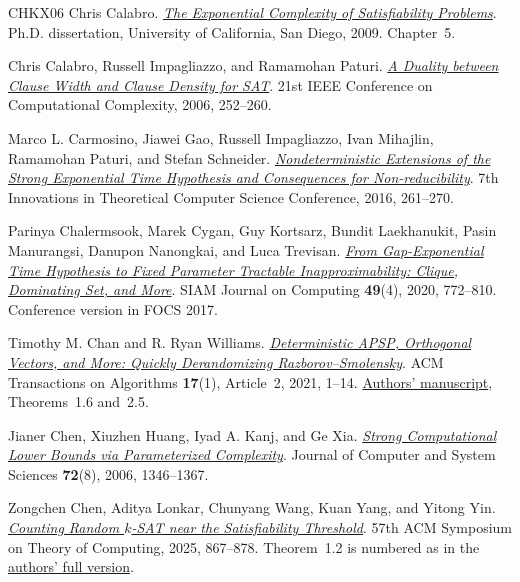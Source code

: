 \documentclass[11pt,reqno]{amsart}
\numberwithin{equation}{section}
\theoremstyle{definition}\newtheorem{definition}[theorem]{Definition}
\theoremstyle{remark}\newtheorem{remark}[theorem]{Remark}
\begin{document}
\begin{thebibliography}{CHKX06}
Chris Calabro.
\href{https://cseweb.ucsd.edu/~ccalabro/dissertation_single_spaced.pdf}
{\emph{The Exponential Complexity of Satisfiability Problems}}.
Ph.D. dissertation, University of California, San Diego, 2009.
Chapter~5.

Chris Calabro, Russell Impagliazzo, and Ramamohan Paturi.
\href{https://cseweb.ucsd.edu/~paturi/myPapers/pubs/CalabroImpagliazzoPaturi_2006_ccc.pdf}
{\emph{A Duality between Clause Width and Clause Density for SAT}}.
21st IEEE Conference on Computational Complexity, 2006, 252--260.

Marco L. Carmosino, Jiawei Gao, Russell Impagliazzo, Ivan Mihajlin,
Ramamohan Paturi, and Stefan Schneider.
\href{https://doi.org/10.1145/2840728.2840746}
{\emph{Nondeterministic Extensions of the Strong Exponential Time
Hypothesis and Consequences for Non-reducibility}}.
7th Innovations in Theoretical Computer Science Conference, 2016, 261--270.

Parinya Chalermsook, Marek Cygan, Guy Kortsarz, Bundit Laekhanukit,
Pasin Manurangsi, Danupon Nanongkai, and Luca Trevisan.
\href{https://doi.org/10.1137/18M1166869}
{\emph{From Gap-Exponential Time Hypothesis to Fixed Parameter Tractable
Inapproximability: Clique, Dominating Set, and More}}.
SIAM Journal on Computing \textbf{49}(4), 2020, 772--810.
Conference version in FOCS 2017.

Timothy M. Chan and R. Ryan Williams.
\href{https://doi.org/10.1145/3402926}
{\emph{Deterministic APSP, Orthogonal Vectors, and More:
Quickly Derandomizing Razborov--Smolensky}}.
ACM Transactions on Algorithms \textbf{17}(1), Article~2, 2021, 1--14.
\href{https://people.csail.mit.edu/rrw/derand-apsp-ov-cr-talg.pdf}{Authors' manuscript}, Theorems~1.6 and~2.5.

Jianer Chen, Xiuzhen Huang, Iyad A. Kanj, and Ge Xia.
\href{https://doi.org/10.1016/j.jcss.2006.04.007}
{\emph{Strong Computational Lower Bounds via Parameterized Complexity}}.
Journal of Computer and System Sciences \textbf{72}(8), 2006, 1346--1367.

Zongchen Chen, Aditya Lonkar, Chunyang Wang, Kuan Yang, and Yitong Yin.
\href{https://doi.org/10.1145/3717823.3718163}
{\emph{Counting Random $k$-SAT near the Satisfiability Threshold}}.
57th ACM Symposium on Theory of Computing, 2025, 867--878.
Theorem~1.2 is numbered as in the \href{https://wcysai.com/publication/randomksat/randomkSAT.pdf}{authors' full version}.


\end{thebibliography}
\end{document}
